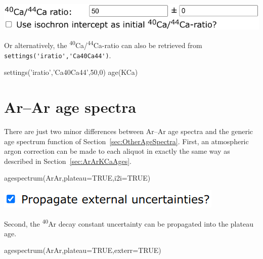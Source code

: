 \begin{refsection}
\noindent\begin{minipage}[t]{.55\linewidth}
\strut\vspace*{-\baselineskip}\newline
\includegraphics[width=\linewidth]{../figures/KCaNominalInitials.png}
\end{minipage}
\begin{minipage}[t]{.45\linewidth}
Or alternatively, the
\textsuperscript{40}Ca/\textsuperscript{44}Ca-ratio can also be
retrieved from \verb|settings('iratio','Ca40Ca44')|.
\end{minipage}

\begin{console}
settings('iratio','Ca40Ca44',50,0)
age(KCa)
\end{console}

\section{Ar--Ar age spectra}\label{sec:ArArAgeSpectra}

There are just two minor differences between Ar--Ar age spectra and
the generic age spectrum function of
Section~\ref{sec:OtherAgeSpectra}. First, an atmospheric argon
correction can be made to each aliquot in exactly the same way as
described in Section~\ref{sec:ArArKCaAges}.

\begin{console}
agespectrum(ArAr,plateau=TRUE,i2i=TRUE)
\end{console}

\noindent\begin{minipage}[t]{.35\linewidth}
\strut\vspace*{-\baselineskip}\newline
\includegraphics[width=\linewidth]{../figures/ArArExterr.png}
\end{minipage}
\begin{minipage}[t]{.65\linewidth}
Second, the \textsuperscript{40}Ar decay constant uncertainty can be
propagated into the plateau age.
\end{minipage}

\begin{console}
agespectrum(ArAr,plateau=TRUE,exterr=TRUE)
\end{console}


\end{refsection}
